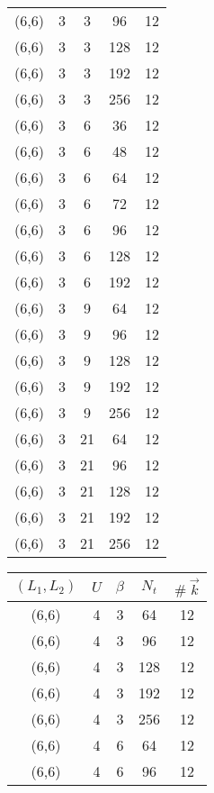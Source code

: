 \begin{table}[!htb]
\begin{tabular}[t]{ccccc}
      \\
      (6,6) & 3 & 3 & 96 & 12
      \\
      (6,6) & 3 & 3 & 128 & 12
      \\
      (6,6) & 3 & 3 & 192 & 12
      \\
      (6,6) & 3 & 3 & 256 & 12
      \\
      \hline
      (6,6) & 3 & 6 & 36 & 12
      \\
      (6,6) & 3 & 6 & 48 & 12
      \\
      (6,6) & 3 & 6 & 64 & 12
      \\
      (6,6) & 3 & 6 & 72 & 12
      \\
      (6,6) & 3 & 6 & 96 & 12
      \\
      (6,6) & 3 & 6 & 128 & 12
      \\
      (6,6) & 3 & 6 & 192 & 12
      \\
      \hline
      (6,6) & 3 & 9 & 64 & 12
      \\
      (6,6) & 3 & 9 & 96 & 12
      \\
      (6,6) & 3 & 9 & 128 & 12
      \\
      (6,6) & 3 & 9 & 192 & 12
      \\
      (6,6) & 3 & 9 & 256 & 12
      \\
      \hline
      (6,6) & 3 & 21 & 64 & 12
      \\
      (6,6) & 3 & 21 & 96 & 12
      \\
      (6,6) & 3 & 21 & 128 & 12
      \\
      (6,6) & 3 & 21 & 192 & 12
      \\
      (6,6) & 3 & 21 & 256 & 12
      \\
      \hline
    \end{tabular}
    \quad
    \begin{tabular}[t]{ccccc}
      $(L_1,L_2)$ & $U$ & $\beta$ & $N_t$ & $\textit{\#}\:\vec{k}$ \\
      \hline
      (6,6) & 4 & 3 & 64 & 12
      \\
      (6,6) & 4 & 3 & 96 & 12
      \\
      (6,6) & 4 & 3 & 128 & 12
      \\
      (6,6) & 4 & 3 & 192 & 12
      \\
      (6,6) & 4 & 3 & 256 & 12
      \\
      \hline
      (6,6) & 4 & 6 & 64 & 12
      \\
      (6,6) & 4 & 6 & 96 & 12
      \\

\end{tabular}
\end{table}
